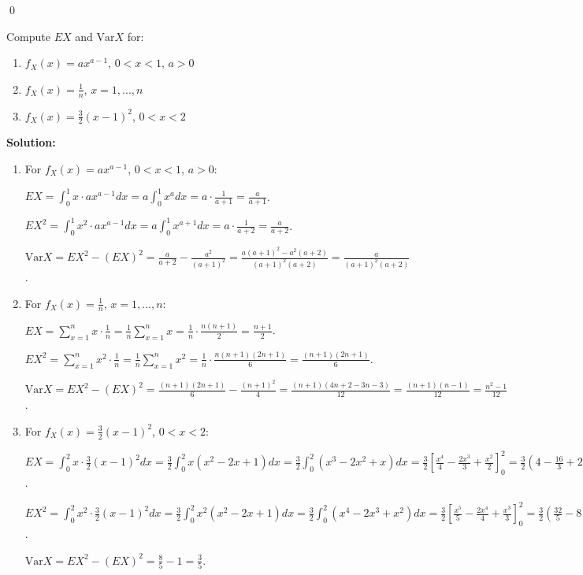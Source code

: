 \qed
\begin{problembox}
Compute $EX$ and $\text{Var}X$ for:
\begin{enumerate}[label=(\alph*)]
    \item $f_X(x)=ax^{a-1}$, $0<x<1$, $a>0$
    \item $f_X(x)=\frac{1}{n}$, $x=1,...,n$
    \item $f_X(x)=\frac{3}{2}(x-1)^2$, $0<x<2$
\end{enumerate}
\end{problembox}

\noindent\textbf{Solution:}
\begin{enumerate}[label=(\alph*)]
    \item For $f_X(x)=ax^{a-1}$, $0<x<1$, $a>0$:
    
    $EX = \int_0^1 x \cdot ax^{a-1}dx = a\int_0^1 x^a dx = a \cdot \frac{1}{a+1} = \frac{a}{a+1}$.
    
    $EX^2 = \int_0^1 x^2 \cdot ax^{a-1}dx = a\int_0^1 x^{a+1} dx = a \cdot \frac{1}{a+2} = \frac{a}{a+2}$.
    
    $\text{Var}X = EX^2 - (EX)^2 = \frac{a}{a+2} - \frac{a^2}{(a+1)^2} = \frac{a(a+1)^2 - a^2(a+2)}{(a+1)^2(a+2)} = \frac{a}{(a+1)^2(a+2)}$.
    
    \item For $f_X(x)=\frac{1}{n}$, $x=1,...,n$:
    
    $EX = \sum_{x=1}^n x \cdot \frac{1}{n} = \frac{1}{n} \sum_{x=1}^n x = \frac{1}{n} \cdot \frac{n(n+1)}{2} = \frac{n+1}{2}$.
    
    $EX^2 = \sum_{x=1}^n x^2 \cdot \frac{1}{n} = \frac{1}{n} \sum_{x=1}^n x^2 = \frac{1}{n} \cdot \frac{n(n+1)(2n+1)}{6} = \frac{(n+1)(2n+1)}{6}$.
    
    $\text{Var}X = EX^2 - (EX)^2 = \frac{(n+1)(2n+1)}{6} - \frac{(n+1)^2}{4} = \frac{(n+1)(4n+2-3n-3)}{12} = \frac{(n+1)(n-1)}{12} = \frac{n^2-1}{12}$.
    
    \item For $f_X(x)=\frac{3}{2}(x-1)^2$, $0<x<2$:
    
    $EX = \int_0^2 x \cdot \frac{3}{2}(x-1)^2dx = \frac{3}{2}\int_0^2 x(x^2-2x+1)dx = \frac{3}{2}\int_0^2 (x^3-2x^2+x)dx = \frac{3}{2}\left[\frac{x^4}{4} - \frac{2x^3}{3} + \frac{x^2}{2}\right]_0^2 = \frac{3}{2}\left(4 - \frac{16}{3} + 2\right) = \frac{3}{2} \cdot \frac{2}{3} = 1$.
    
    $EX^2 = \int_0^2 x^2 \cdot \frac{3}{2}(x-1)^2dx = \frac{3}{2}\int_0^2 x^2(x^2-2x+1)dx = \frac{3}{2}\int_0^2 (x^4-2x^3+x^2)dx = \frac{3}{2}\left[\frac{x^5}{5} - \frac{2x^4}{4} + \frac{x^3}{3}\right]_0^2 = \frac{3}{2}\left(\frac{32}{5} - 8 + \frac{8}{3}\right) = \frac{3}{2} \cdot \frac{16}{15} = \frac{8}{5}$.
    
    $\text{Var}X = EX^2 - (EX)^2 = \frac{8}{5} - 1 = \frac{3}{5}$.
\end{enumerate}


